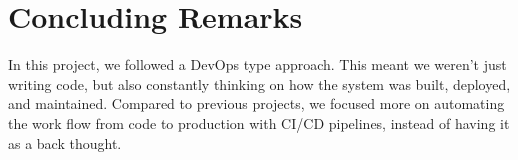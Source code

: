 \section{Concluding Remarks}


In this project, we followed a DevOps type approach. This meant we weren’t just writing code, but also constantly thinking on how the system was built, deployed, and maintained. Compared to previous projects, we focused more on automating the work flow from code to production with CI/CD pipelines, instead of having it as a back thought.
